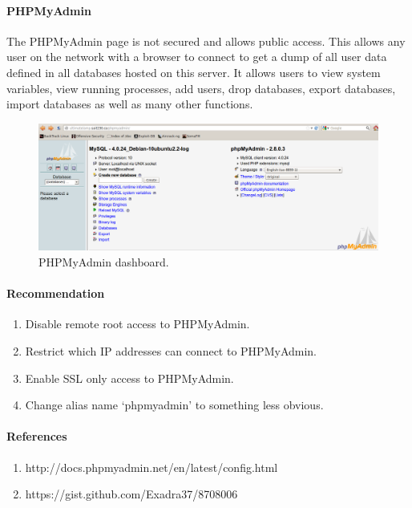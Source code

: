 \documentclass{article}
\begin{document}
\paragraph{PHPMyAdmin}
The PHPMyAdmin page is not secured and allows public access. This allows
any user on the network with a browser to connect to get a dump of all user
data defined in all databases hosted on this server. It allows
users to view system variables, view running processes, add users, drop
databases, export databases, import databases as well as many other functions.

\begin{figure}[h!]
  \includegraphics[width=\linewidth]{images/ultimatelamp-php-myadmin.png}
  \caption{PHPMyAdmin dashboard.}
  \label{fig:ultimatelamp-phpmyadmin}
\end{figure}

\paragraph{Recommendation}

\begin{enumerate}
  \item Disable remote root access to PHPMyAdmin.
  \item Restrict which IP addresses can connect to PHPMyAdmin.
  \item Enable SSL only access to PHPMyAdmin.
  \item Change alias name `phpmyadmin' to something less obvious.
\end{enumerate}

\paragraph{References}

\begin{enumerate}
  \item http://docs.phpmyadmin.net/en/latest/config.html
  \item https://gist.github.com/Exadra37/8708006
\end{enumerate}
\end{document}
